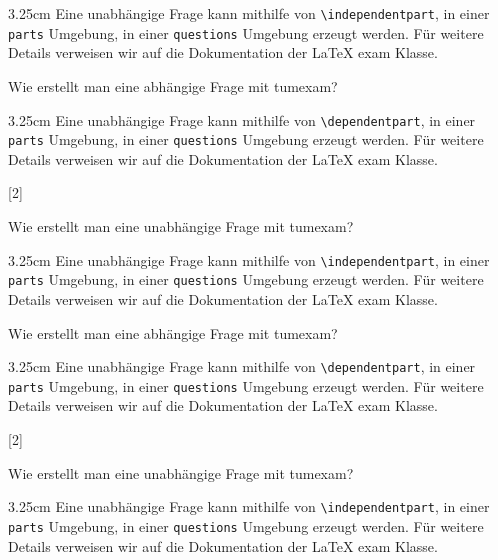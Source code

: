 \documentclass[german, @CLASSOPTIONS@]{tumexam}
\begin{document}
\begin{questions}
\begin{parts}
    \begin{solutionbox}{3.25cm}
      Eine unabhängige Frage kann mithilfe von \texttt{\textbackslash{independentpart}}, in einer \texttt{parts} Umgebung, in einer \texttt{questions} Umgebung erzeugt werden. Für weitere Details verweisen wir auf die Dokumentation der \LaTeX{} exam Klasse.
    \end{solutionbox}
    \dependentpart
    Wie erstellt man eine abhängige Frage mit tumexam?
    \begin{solutionbox}{3.25cm}
      Eine unabhängige Frage kann mithilfe von \texttt{\textbackslash{dependentpart}}, in einer \texttt{parts} Umgebung, in einer \texttt{questions} Umgebung erzeugt werden. Für weitere Details verweisen wir auf die Dokumentation der \LaTeX{} exam Klasse.
    \end{solutionbox}
  \end{parts}
  \clearpage
  [2]
  \begin{parts}
    \independentpart
    Wie erstellt man eine unabhängige Frage mit tumexam?
    \begin{solutionbox}{3.25cm}
      Eine unabhängige Frage kann mithilfe von \texttt{\textbackslash{independentpart}}, in einer \texttt{parts} Umgebung, in einer \texttt{questions} Umgebung erzeugt werden. Für weitere Details verweisen wir auf die Dokumentation der \LaTeX{} exam Klasse.
    \end{solutionbox}
    \dependentpart
    Wie erstellt man eine abhängige Frage mit tumexam?
    \begin{solutionbox}{3.25cm}
      Eine unabhängige Frage kann mithilfe von \texttt{\textbackslash{dependentpart}}, in einer \texttt{parts} Umgebung, in einer \texttt{questions} Umgebung erzeugt werden. Für weitere Details verweisen wir auf die Dokumentation der \LaTeX{} exam Klasse.
    \end{solutionbox}
  \end{parts}
  \clearpage
  [2]
  \begin{parts}
    \independentpart
    Wie erstellt man eine unabhängige Frage mit tumexam?
    \begin{solutionbox}{3.25cm}
      Eine unabhängige Frage kann mithilfe von \texttt{\textbackslash{independentpart}}, in einer \texttt{parts} Umgebung, in einer \texttt{questions} Umgebung erzeugt werden. Für weitere Details verweisen wir auf die Dokumentation der \LaTeX{} exam Klasse.

\end{solutionbox}
\end{parts}
\end{questions}
\end{document}
